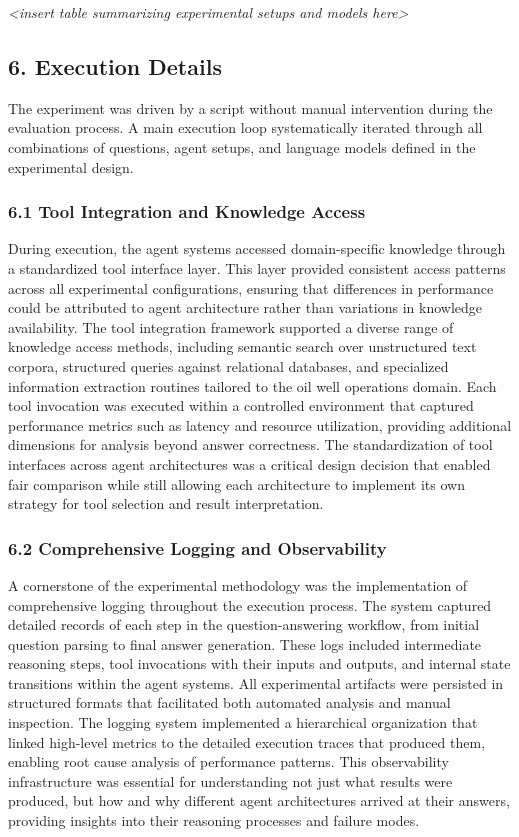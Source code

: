                 \textit{<insert table summarizing experimental setups and models here>}

        \subsection{6. Execution Details}

            The experiment was driven by a script without manual intervention during the evaluation process. A main execution loop systematically iterated through all combinations of questions, agent setups, and language models defined in the experimental design. 

            \subsubsection{6.1 Tool Integration and Knowledge Access}

            During execution, the agent systems accessed domain-specific knowledge through a standardized tool interface layer. This layer provided consistent access patterns across all experimental configurations, ensuring that differences in performance could be attributed to agent architecture rather than variations in knowledge availability. The tool integration framework supported a diverse range of knowledge access methods, including semantic search over unstructured text corpora, structured queries against relational databases, and specialized information extraction routines tailored to the oil well operations domain. Each tool invocation was executed within a controlled environment that captured performance metrics such as latency and resource utilization, providing additional dimensions for analysis beyond answer correctness. The standardization of tool interfaces across agent architectures was a critical design decision that enabled fair comparison while still allowing each architecture to implement its own strategy for tool selection and result interpretation.

            \subsubsection{6.2 Comprehensive Logging and Observability}

            A cornerstone of the experimental methodology was the implementation of comprehensive logging throughout the execution process. The system captured detailed records of each step in the question-answering workflow, from initial question parsing to final answer generation. These logs included intermediate reasoning steps, tool invocations with their inputs and outputs, and internal state transitions within the agent systems. All experimental artifacts were persisted in structured formats that facilitated both automated analysis and manual inspection. The logging system implemented a hierarchical organization that linked high-level metrics to the detailed execution traces that produced them, enabling root cause analysis of performance patterns. This observability infrastructure was essential for understanding not just what results were produced, but how and why different agent architectures arrived at their answers, providing insights into their reasoning processes and failure modes.

